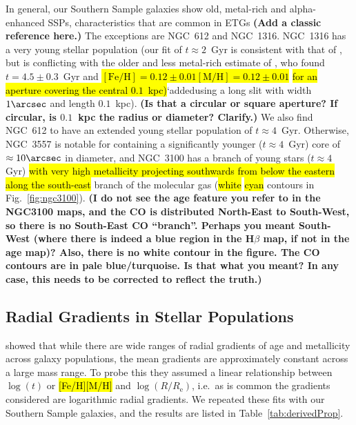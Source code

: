 \documentclass[a4paper,fleqn,usenatbib]{mnras}
\DeclareRobustCommand{\removed}[1]{{\sethlcolor{red}\hl{#1}}}
\DeclareRobustCommand{\added}[1]{{\sethlcolor{green}\hl{#1}}}
\begin{document}
In general, our Southern Sample galaxies show old, metal-rich and
alpha-enhanced SSPs, characteristics that are common in ETGs \added{\citep[e.g.][]{Worthey1992}}{\bf (Add
  a classic reference here.)} The exceptions are NGC~612 and
NGC~1316. NGC~1316 has a very young stellar population (our fit of
$t\approx2$~Gyr is consistent with that of \citealt{Kuntschner2000},
but is conflicting with the older and less metal-rich estimate of
\citealt{Koleva2011}, who found $t=4.5\pm0.3$~Gyr and
\removed{$\mathrm{[Fe/H]}=0.12\pm0.01$}\added{$\mathrm{[M/H]}=0.12\pm0.01$} \removed{for an aperture covering the central
$0.1$~kpc)}`added{using a long slit with width $1\arcsec$ and length $0.1$~kpc)}. {\bf (Is that a circular or square aperture? If circular,
  is $0.1$~kpc the radius or diameter? Clarify.)} We also find NGC~612
to have an extended young stellar population of
$t\approx4$~Gyr. Otherwise, NGC~3557 is notable for containing a
significantly younger ($t\approx4$~Gyr) core of $\approx10\arcsec$ in
diameter, and NGC~3100 has a branch of young stars ($t\approx4$\,Gyr) \added{with very high metallicity projecting southwards from below the eastern}
\removed{along the south-east} branch of the molecular gas (\removed{white} 
\added{cyan} contours in
Fig.~\ref{fig:ngc3100}). {\bf (I do not see the age feature you refer
  to in the NGC3100 maps, and the CO is distributed North-East to
  South-West, so there is no South-East CO ``branch''. Perhaps you
  meant South-West (where there is indeed a blue region in the
  H$\beta$ map, if not in the age map)? Also, there is no white
  contour in the figure. The CO contours are in pale
  blue/turquoise. Is that what you meant? In any case, this needs to
  be corrected to reflect the truth.)}

\subsection{Radial Gradients in Stellar Populations}
\label{subsec:popGrad}

\citet{Koleva2011} showed that while there are wide ranges of radial
gradients of age and metallicity across galaxy populations, the mean
gradients are approximately constant across a large mass range. To
probe this they assumed a linear relationship between $\log(t)$ or
\removed{[Fe/H]}\added{[M/H]} and $\log(R/R_\text{e})$, i.e.\ as is common the gradients
considered are logarithmic radial gradients. We repeated these fits
with our Southern Sample galaxies, and the results are listed in
Table~\ref{tab:derivedProp}.
\end{document}
